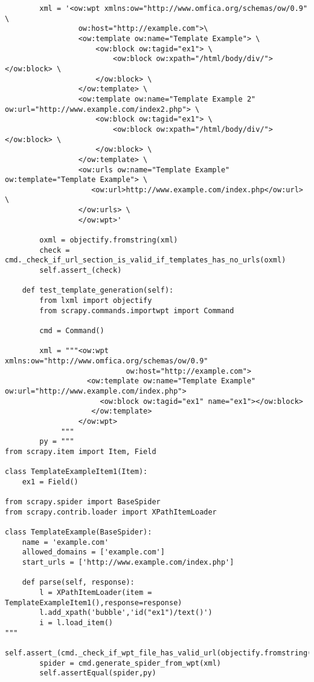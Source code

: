 \begin{lstlisting}
        xml = '<ow:wpt xmlns:ow="http://www.omfica.org/schemas/ow/0.9" \
                 ow:host="http://example.com">\
                 <ow:template ow:name="Template Example"> \
                     <ow:block ow:tagid="ex1"> \
                         <ow:block ow:xpath="/html/body/div/"></ow:block> \
                     </ow:block> \
                 </ow:template> \
                 <ow:template ow:name="Template Example 2" ow:url="http://www.example.com/index2.php"> \
                     <ow:block ow:tagid="ex1"> \
                         <ow:block ow:xpath="/html/body/div/"></ow:block> \
                     </ow:block> \
                 </ow:template> \
                 <ow:urls ow:name="Template Example" ow:template="Template Example"> \
                    <ow:url>http://www.example.com/index.php</ow:url> \
                 </ow:urls> \
                 </ow:wpt>'

        oxml = objectify.fromstring(xml)
        check = cmd._check_if_url_section_is_valid_if_templates_has_no_urls(oxml)
        self.assert_(check)

    def test_template_generation(self):
        from lxml import objectify
        from scrapy.commands.importwpt import Command

        cmd = Command()

        xml = """<ow:wpt xmlns:ow="http://www.omfica.org/schemas/ow/0.9"
                            ow:host="http://example.com">
                   <ow:template ow:name="Template Example" ow:url="http://www.example.com/index.php">
                      <ow:block ow:tagid="ex1" name="ex1"></ow:block>
                    </ow:template> 
                 </ow:wpt>
             """
        py = """
from scrapy.item import Item, Field

class TemplateExampleItem1(Item):
    ex1 = Field()

from scrapy.spider import BaseSpider
from scrapy.contrib.loader import XPathItemLoader

class TemplateExample(BaseSpider):
    name = 'example.com'
    allowed_domains = ['example.com']
    start_urls = ['http://www.example.com/index.php']

    def parse(self, response):
        l = XPathItemLoader(item = TemplateExampleItem1(),response=response)
        l.add_xpath('bubble','id("ex1")/text()') 
        i = l.load_item()
"""
        self.assert_(cmd._check_if_wpt_file_has_valid_url(objectify.fromstring(xml)))
        spider = cmd.generate_spider_from_wpt(xml)
        self.assertEqual(spider,py)

\end{lstlisting}

